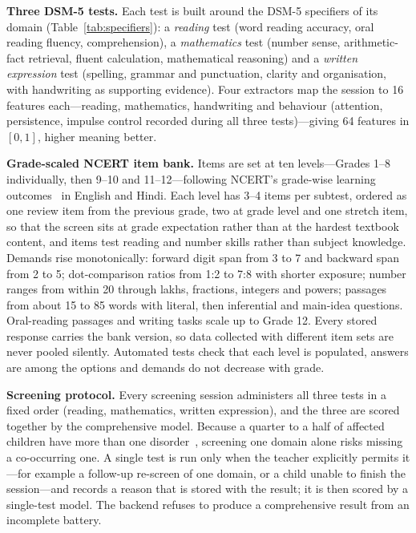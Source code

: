\documentclass[conference]{IEEEtran}
\begin{document}
\textbf{Three DSM-5 tests.} Each test is built around the DSM-5 specifiers of its domain (Table~\ref{tab:specifiers}): a \emph{reading} test (word reading accuracy, oral reading fluency, comprehension), a \emph{mathematics} test (number sense, arithmetic-fact retrieval, fluent calculation, mathematical reasoning) and a \emph{written expression} test (spelling, grammar and punctuation, clarity and organisation, with handwriting as supporting evidence). Four extractors map the session to 16 features each---reading, mathematics, handwriting and behaviour (attention, persistence, impulse control recorded during all three tests)---giving 64 features in $[0,1]$, higher meaning better.

\textbf{Grade-scaled NCERT item bank.} Items are set at ten levels---Grades 1--8 individually, then 9--10 and 11--12---following NCERT's grade-wise learning outcomes~\cite{ncert2017lo} in English and Hindi. Each level has 3--4 items per subtest, ordered as one review item from the previous grade, two at grade level and one stretch item, so that the screen sits at grade expectation rather than at the hardest textbook content, and items test reading and number skills rather than subject knowledge. Demands rise monotonically: forward digit span from 3 to 7 and backward span from 2 to 5; dot-comparison ratios from 1:2 to 7:8 with shorter exposure; number ranges from within 20 through lakhs, fractions, integers and powers; passages from about 15 to 85 words with literal, then inferential and main-idea questions. Oral-reading passages and writing tasks scale up to Grade 12. Every stored response carries the bank version, so data collected with different item sets are never pooled silently. Automated tests check that each level is populated, answers are among the options and demands do not decrease with grade.

\textbf{Screening protocol.} Every screening session administers all three tests in a fixed order (reading, mathematics, written expression), and the three are scored together by the comprehensive model. Because a quarter to a half of affected children have more than one disorder~\cite{willcutt2013}, screening one domain alone risks missing a co-occurring one. A single test is run only when the teacher explicitly permits it---for example a follow-up re-screen of one domain, or a child unable to finish the session---and records a reason that is stored with the result; it is then scored by a single-test model. The backend refuses to produce a comprehensive result from an incomplete battery.
\end{document}
